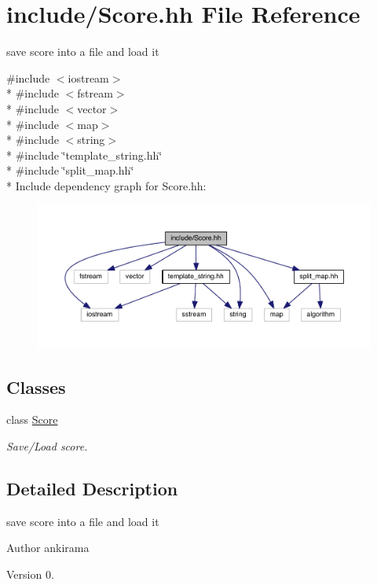 \hypertarget{_score_8hh}{}\section{include/\+Score.hh File Reference}
\label{_score_8hh}


save score into a file and load it  


{\ttfamily \#include $<$iostream$>$}\\*
{\ttfamily \#include $<$fstream$>$}\\*
{\ttfamily \#include $<$vector$>$}\\*
{\ttfamily \#include $<$map$>$}\\*
{\ttfamily \#include $<$string$>$}\\*
{\ttfamily \#include \char`\"{}template\+\_\+string.\+hh\char`\"{}}\\*
{\ttfamily \#include \char`\"{}split\+\_\+map.\+hh\char`\"{}}\\*
Include dependency graph for Score.\+hh\+:\nopagebreak
\begin{figure}[H]
\begin{center}
\leavevmode
\includegraphics[width=350pt]{_score_8hh__incl}
\end{center}
\end{figure}
\subsection*{Classes}
\begin{DoxyCompactItemize}
\item 
class \hyperlink{class_score}{Score}
\begin{DoxyCompactList}\small\item\em Save/\+Load score. \end{DoxyCompactList}\end{DoxyCompactItemize}


\subsection{Detailed Description}
save score into a file and load it 

\begin{DoxyAuthor}{Author}
ankirama 
\end{DoxyAuthor}
\begin{DoxyVersion}{Version}
0. 
\end{DoxyVersion}
